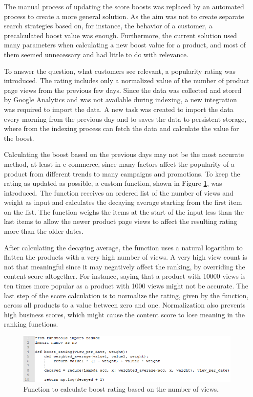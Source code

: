 The manual process of updating the score boosts was replaced by an automated process to create a more general solution.
As the aim was not to create separate search strategies based on, for instance, the behavior of a customer, 
a precalculated boost value was enough.
Furthermore, the current solution used many parameters when calculating a new boost value for a product, and 
most of them seemed unnecessary and had little to do with relevance.

To answer the question, what customers see relevant, a popularity rating was introduced. 
The rating includes only a normalized value of the number of product page views from the previous few days.
Since the data was collected and stored by Google Analytics and was not available during indexing,
a new integration was required to import the data.
A new task was created to import the data every morning from the previous day and to saves the data
to persistent storage, where from the indexing process can fetch the data and calculate the value for the boost.


Calculating the boost based on the previous days may not be the most accurate method, at least in e-commerce, since 
many factors affect the popularity of a product from different trends to many campaigns and promotions.
To keep the rating as updated as possible, a custom function, shown in Figure \ref{fig:new-boost-rating}, was introduced.
The function receives an ordered list of the number of views and weight as input and 
calculates the decaying average starting from the first item on the list.
The function weighs the items at the start of the input less than the last items to allow the newer 
product page views to affect the resulting rating more than the older dates.


After calculating the decaying average, the function uses a natural logarithm to flatten the products with
a very high number of views.
A very high view count is not that meaningful since it may negatively affect the ranking,  
by overriding the content score altogether.
For instance, saying that a product with 10000 views is ten times more popular as a product with 1000 views might not be accurate.
The last step of the score calculation is to normalize the rating, given by the function, across all products
to a value between zero and one.
Normalization also prevents high business scores, which might cause the content score to lose meaning in 
the ranking functions.

\begin{figure}
    \centering
    \includegraphics[width=\textwidth]{img/new-boost-rating.png}
    \caption{Function to calculate boost rating based on the number of views.}
    \label{fig:new-boost-rating}
\end{figure}


